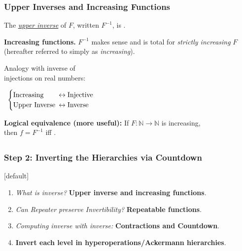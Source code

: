 \begin{frame}
\frametitle{Upper Inverses and Increasing Functions}
The \href{https://github.com/inv-ack/inv-ack/blob/7270e64a2600b771f2b1b1b151f7d13fb2ae6c97/inverse.v\#L28-L45}{
	\emph{upper inverse}} of $F$, written $F^{-1}$,
is .


\bigskip

\pause 
\textbf{Increasing functions.} $F^{-1}$ makes sense and is total for \emph{strictly increasing} $F$ (hereafter referred to simply as \emph{increasing}).

\bigskip

\pause 
\begin{minipage}{0.4\linewidth}
	Analogy with inverse of \\
		     injections on real numbers:
\end{minipage} \ $\begin{cases}
\text{Increasing} & \hspace{-0.5em}\leftrightarrow \text{Injective} \\
\text{Upper Inverse} & \hspace{-0.5em}\leftrightarrow \text{Inverse}
\end{cases}$

\bigskip

\pause 
\textbf{Logical equivalence (more useful):}
\href{https://github.com/inv-ack/inv-ack/blob/7270e64a2600b771f2b1b1b151f7d13fb2ae6c97/inverse.v\#L65-L77}{\coq} If $F:\mathbb{N}\to \mathbb{N}$ is increasing, \\
then $f = F^{-1}$ iff .

\end{frame}

\subsection*{}
\begin{frame}
\frametitle{Step 2: Inverting the Hierarchies via \textbf{Countdown}}
[default]

\begin{enumerate}[\bfseries 1.]
	\itemsep 3ex
	\item<done@1->
	\emph{What is inverse?} \textbf{Upper inverse and increasing functions}.
	
	\item<come@2->
	\emph{Can Repeater preserve Invertibility?} \textbf{Repeatable functions}.
	
	\item
	\emph{Computing inverse with inverse:} \textbf{Contractions and Countdown}.
	
	\item
	\textbf{Invert each level in hyperoperations/Ackermann hierarchies}.
\end{enumerate}
\end{frame}


